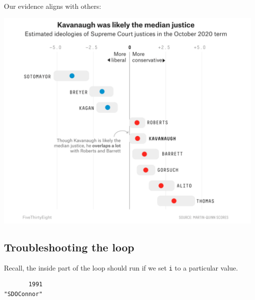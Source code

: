 \documentclass[
  letterpaper,
  DIV=11,
  numbers=noendperiod]{scrreprt}
\newenvironment{Shaded}{\begin{snugshade}}{\end{snugshade}}
\newcommand{\DecValTok}[1]{\textcolor[rgb]{0.68,0.00,0.00}{#1}}
\newcommand{\FunctionTok}[1]{\textcolor[rgb]{0.28,0.35,0.67}{#1}}
\newcommand{\NormalTok}[1]{\textcolor[rgb]{0.00,0.23,0.31}{#1}}
\newcommand{\OtherTok}[1]{\textcolor[rgb]{0.00,0.23,0.31}{#1}}
\newcommand{\SpecialCharTok}[1]{\textcolor[rgb]{0.37,0.37,0.37}{#1}}
\begin{document}
Our evidence aligns with others:

\includegraphics{images/sccourt2.png}

\hypertarget{troubleshooting-the-loop}{%
\subsection{Troubleshooting the loop}\label{troubleshooting-the-loop}}

Recall, the inside part of the loop should run if we set \texttt{i} to a
particular value.

\begin{Shaded}
\end{Shaded}

\begin{verbatim}
       1991 
"SDOConnor" 
\end{verbatim}
\end{document}
